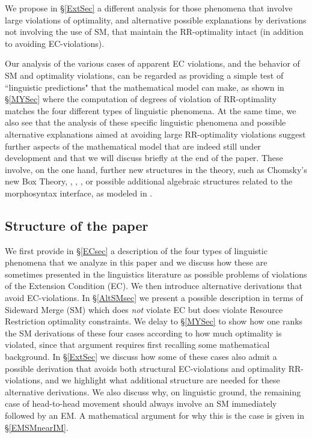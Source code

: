 \documentclass[12pt]{amsart}
\numberwithin{equation}{section}
\begin{document}
We propose in \S \ref{ExtSec}  a different analysis for those phenomena 
that involve large violations of optimality, and alternative possible
explanations by derivations not involving the use of SM,
that maintain the RR-optimality intact (in addition to avoiding EC-violations). 

\smallskip

Our analysis of the various cases of apparent EC violations, and the
behavior of SM and optimality violations, 
can be regarded as providing a simple test of ``linguistic predictions" that
the mathematical model can make, as shown in \S \ref{MYSec} where
the computation of degrees of violation of RR-optimality matches 
the four different types of linguistic phenomena. At the same time,
we also see that the analysis of these specific linguistic phenomena
and possible alternative explanations aimed at avoiding large RR-optimality
violations suggest further aspects of the mathematical model that are indeed
still under development and that we will discuss briefly at the 
end of the paper. These involve, on the one hand,  further new structures in the 
theory, such as Chomsky's new Box Theory, \cite{ChomskyKeio}, \cite{Chomsky23a},
\cite{Chomsky23b}, or possible additional algebraic structures related to 
the morphosyntax interface, as modeled
in \cite{SentMar}. 



\smallskip
\subsection{Structure of the paper}\label{PlanSec} 

We first provide in \S \ref{ECsec} a description of the
four types of linguistic phenomena that we analyze in this
paper and we discuss how these are sometimes 
presented in the linguistics literature as possible problems
of violations of the Extension Condition (EC).
We then introduce alternative derivations that avoid
EC-violations. In \S \ref{AltSMsec} we present a possible
description in terms of Sideward Merge (SM) which
does {\em not} violate EC but does violate 
Resource Restriction optimality constraints. We delay to
 \S \ref{MYSec} to show how one ranks the SM derivations 
of these four cases according to how much optimality is violated,
since that argument requires first recalling some mathematical
background. In \S \ref{ExtSec} we discuss how some of these
cases also admit a possible derivation that 
avoids both structural EC-violations and optimality RR-violations,
and we highlight what additional structure are needed for these
alternative derivations. 
We also discuss why, on linguistic ground, the remaining
case of head-to-head movement should always involve
an SM immediately followed by an EM. A mathematical
argument for why this is the case is given in \S \ref{EMSMnearIM}.
\end{document}
